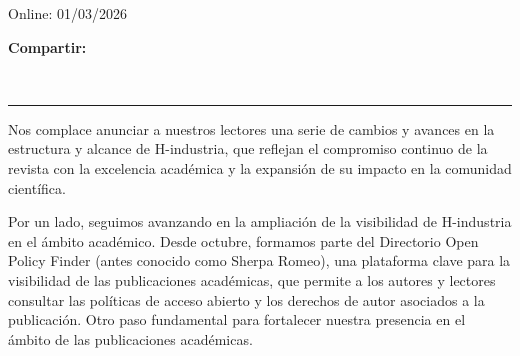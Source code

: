\begin{textblock*}{68mm}
{\begin{minipage}[t]{68mm}
Online: 01/03/2026\par
\vspace{6pt}
\vspace{6pt}
{\bfseries\color{azulrevista!70}Compartir:}\par\vspace{3pt}
{\large
\href{https://bsky.app/intent/compose?text=url-html}{}~
\href{mailto:?subject=T%C3%ADtulo%20del%20editorial%20de%20la%20revista&body=url-html}{}~
\href{https://www.facebook.com/sharer/sharer.php?u=url-html}{}~
\href{https://www.linkedin.com/sharing/share-offsite/?url=url-html}{}~
\href{https://www.reddit.com/submit?url=url-html&title=T%C3%ADtulo%20del%20editorial%20de%20la%20revista}{}~
\href{https://www.researchgate.net/search?q=T%C3%ADtulo%20del%20editorial%20de%20la%20revista}{}~
\href{https://t.me/share/url?url=url-html&text=T%C3%ADtulo%20del%20editorial%20de%20la%20revista}{}~
\href{https://wa.me/?text=url-html}{}~
\href{https://twitter.com/intent/tweet?url=url-html&text=T%C3%ADtulo%20del%20editorial%20de%20la%20revista}{}
}\par
\end{minipage}%
}%
\end{textblock*}


\bigskip
\noindent\rule{\linewidth}{0.4pt}
\bigskip

Nos complace anunciar a nuestros lectores una serie de cambios y avances en la estructura y alcance de H-industria, que reflejan el compromiso continuo de la revista con la excelencia académica y la expansión de su impacto en la comunidad científica.

Por un lado, seguimos avanzando en la ampliación de la visibilidad de H-industria en el ámbito académico. Desde octubre, formamos parte del Directorio Open Policy Finder (antes conocido como Sherpa Romeo), una plataforma clave para la visibilidad de las publicaciones académicas, que permite a los autores y lectores consultar las políticas de acceso abierto y los derechos de autor asociados a la publicación. Otro paso fundamental para fortalecer nuestra presencia en el ámbito de las publicaciones académicas.

